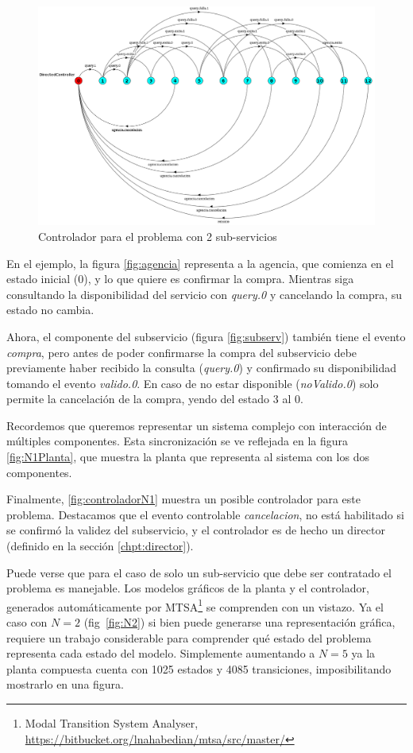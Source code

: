 \begin{figure}[htb]
	\includegraphics[width=\linewidth]{figures/ejemploServicios/N2Controlador.png}  
	\caption{Controlador para el problema con 2 sub-servicios}
	\label{fig:N2-control}
\end{figure}

En el ejemplo, la figura \ref{fig:agencia} representa a la agencia, que comienza en el estado inicial (0), y lo que quiere es confirmar la compra. Mientras siga consultando la disponibilidad del servicio con \textit{query.0} y cancelando la compra, su estado no cambia. 

Ahora, el componente del subservicio (figura \ref{fig:subserv}) también tiene el evento \textit{compra}, pero antes de poder confirmarse la compra del subservicio debe previamente haber recibido la consulta (\textit{query.0}) y confirmado su disponibilidad tomando el evento \textit{valido.0}. En caso de no estar disponible (\textit{noValido.0}) solo permite la cancelación de la compra, yendo del estado 3 al 0.

Recordemos que queremos representar un sistema complejo con interacción de múltiples componentes. Esta sincronización se ve reflejada en la figura \ref{fig:N1Planta}, que muestra la planta que representa al sistema con los dos componentes. 

Finalmente, \ref{fig:controladorN1} muestra un posible controlador para este problema. Destacamos que el evento controlable \textit{cancelacion}, no está habilitado si se confirmó la validez del subservicio, y el controlador es de hecho un director (definido en la sección \ref{chpt:director}). 

Puede verse que para el caso de solo un sub-servicio que debe ser contratado el problema es manejable. Los modelos gráficos de la planta y el controlador, generados automáticamente por MTSA\footnote{Modal Transition System Analyser, \href{https://bitbucket.org/lnahabedian/mtsa/src/master/^}{https://bitbucket.org/lnahabedian/mtsa/src/master/}} se comprenden con un vistazo. Ya el caso con $N=2$ (fig~\ref{fig:N2}) si bien puede generarse una representación gráfica, requiere un trabajo considerable para comprender qué estado del problema representa cada estado del modelo. Simplemente aumentando a $N=5$ ya la planta compuesta cuenta con 1025 estados y 4085 transiciones, imposibilitando mostrarlo en una figura. 


